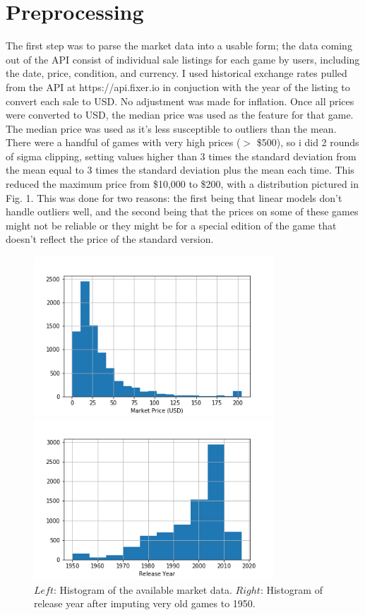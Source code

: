 \documentclass[12pt]{article}
\begin{document}
\section{Preprocessing}
The first step was to parse the market data into a usable form; the data coming out of the API consist of individual sale listings for each game by users, including the date, price, condition, and currency. I used historical exchange rates pulled from the API at https://api.fixer.io in conjuction with the year of the listing to convert each sale to USD. No adjustment was made for inflation. Once all prices were converted to USD, the median price was used as the feature for that game. The median price was used as it's less susceptible to outliers than the mean. There were a handful of games with very high prices ($>$ \$500), so i did 2 rounds of sigma clipping, setting values higher than 3 times the standard deviation from the mean equal to 3 times the standard deviation plus the mean each time. This reduced the maximum price from \$10,000 to \$200, with a distribution pictured in Fig. 1. This was done for two reasons: the first being that linear models don't handle outliers well, and the second being that the prices on some of these games might not be reliable or they might be for a special edition of the game that doesn't reflect the price of the standard version.

\begin{figure}[ht]
\centering
\begin{minipage}{.48\textwidth}
\centering
\includegraphics[height=6cm]{market_price_hist.png}
\end{minipage} \hfil
\centering
\begin{minipage}{.48\textwidth}
\centering
\includegraphics[height=6cm]{market_year_hist.png}
\end{minipage}
\caption{\small $Left$: Histogram of the available market data. $Right$: Histogram of release year after imputing very old games to 1950.}
\end{figure}
\end{document}
